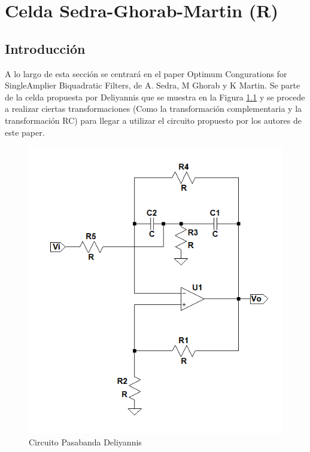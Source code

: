 \chapter{Celda Sedra-Ghorab-Martin (R)}

\section{Introducción}

A lo largo de esta sección se centrará en el paper Optimum Congurations
for SingleAmplier Biquadratic Filters, de A. Sedra, M Ghorab y K Martin.
Se parte de la celda propuesta por Deliyannis que se muestra en la
Figura \ref{3_1} y se procede a realizar ciertas transformaciones
(Como la transformación complementaria y la transformación RC) para
llegar a utilizar el circuito propuesto por los autores de este paper.

\begin{figure}[H]
\begin{centering}
\includegraphics[scale=0.5]{../Ex3/Resources/Deliyannis}
\par\end{centering}
\caption{Circuito Pasabanda Deliyannis}
\label{3_1}

\end{figure}


